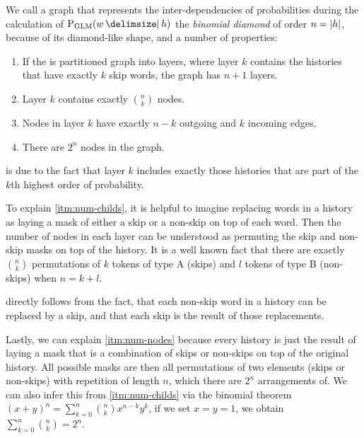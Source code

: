 We call a graph that represents the inter-dependencies of probabilities during
the calculation of $\ProbGLM{w}{h}$ the \emph{binomial diamond} of order
$n = {\left|h\right|}$, because of its diamond-like shape, and a number of
properties:

\begin{enumerate}
  \item \label{itm:num-layers} If the is partitioned graph into layers, where
    layer $k$ contains the histories that have exactly $k$ skip words, the graph
    has $n + 1$ layers.
  \item \label{itm:num-childs} Layer $k$ contains exactly $\binom{n}{k}$ nodes.
  \item \label{itm:num-edges}  Nodes in layer $k$ have exactly $n - k$ outgoing
    and $k$ incoming edges.
  \item \label{itm:num-nodes}  There are $2^n$ nodes in the graph.
\end{enumerate}

 is due to the fact that layer $k$ includes exactly those
histories that are part of the $k$th highest order of probability.

To explain \cref{itm:num-childs}, it is helpful to imagine replacing words in
a history as laying a mask of either a skip or a non-skip on top of each word.
Then the number of nodes in each layer can be understood as permuting the
skip and non-skip masks on top of the history.
It is a well known fact that there are exactly $\binom{n}{k}$ permutations of
$k$ tokens of type A (skips) and $l$ tokens of type B (non-skips) when
$n = k + l$.

 directly follows from the fact, that each non-skip word
in a history can be replaced by a skip, and that each skip is the result
of those replacements.

Lastly, we can explain \cref{itm:num-nodes} because every history is just the
result of laying a mask that is a combination of skips or non-skips on top of
the original history.
All possible masks are then all permutations of two elements (skips or
non-skips) with repetition of length $n$, which there are $2^n$ arrangements of.
We can also infer this from \cref{itm:num-childs} via the binomial theorem
$(x+ y)^n = \sum_{k=0}^n \binom{n}{k} x^{n-k} y^k$, if we set ${x = y = 1}$,
we obtain $\sum_{k=0}^n \binom{n}{k} = 2^n$.

